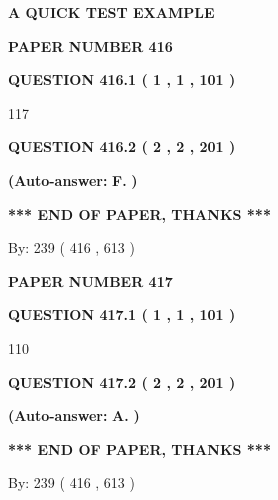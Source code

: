 \documentclass[12pt]{article}
\begin{document}
 
 
 
 
   
   
   
   
   
   
{\LARGE {\textbf{ A QUICK TEST EXAMPLE}}}
   
   
   
   
\setcounter{page}{ 
   416001 } 
   
   
 {\textbf{ \Large{ PAPER NUMBER  416  }}}
   
   
   
   
  
  
{\textbf{\large{QUESTION
416.1 
 ( 1 , 1 , 101 )
}}}

117
  
  
{\textbf{\large{QUESTION
416.2 
 ( 2 , 2 , 201 )
}}}
 
 
{\textbf{(Auto-answer:}}
{\textbf{\large{
F.}}}
{\textbf{)}}
 
 
   
   
   
   
\vspace{1.0in} 
{\textbf{\large{ *** END OF PAPER, THANKS *** }}} 
   
   
\hspace{1.0in} By: 
 239 ( 416 ,  613 )
   
   
   
   
\newpage 
\setcounter{page}{ 
   417001 } 
   
   
 {\textbf{ \Large{ PAPER NUMBER  417  }}}
   
   
   
   
  
  
{\textbf{\large{QUESTION
417.1 
 ( 1 , 1 , 101 )
}}}

110
  
  
{\textbf{\large{QUESTION
417.2 
 ( 2 , 2 , 201 )
}}}
 
 
{\textbf{(Auto-answer:}}
{\textbf{\large{
A.}}}
{\textbf{)}}
 
 
   
   
   
   
\vspace{1.0in} 
{\textbf{\large{ *** END OF PAPER, THANKS *** }}} 
   
   
\hspace{1.0in} By: 
 239 ( 416 ,  613 )
   
   
   
\end{document}
